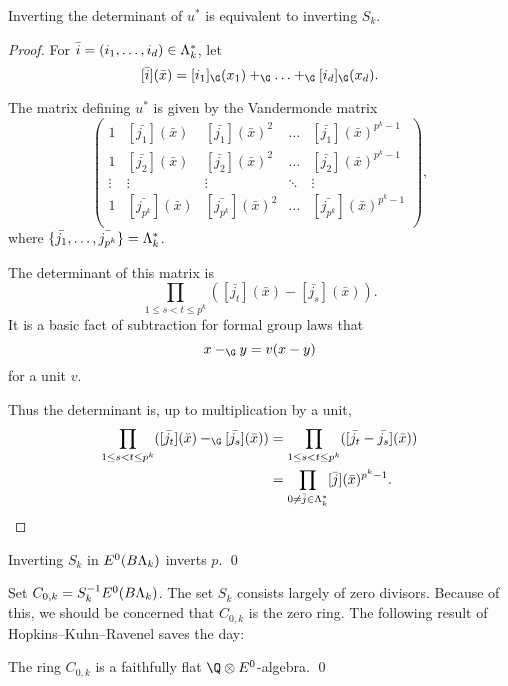 \begin{lemma} \label{det}
Inverting the determinant of $u^*$ is equivalent to inverting $S_k$.
\end{lemma}
\begin{proof}
For $\bar{i} = (i_1, \ldots, i_d) \in \Lambda_k^*$, let
\[
[\bar{i}](\bar{x}) = [i_1]_{\G}(x_1) +_{\G} \ldots +_{\G} [i_d]_{\G}(x_d).
\]

The matrix defining $u^*$ is given by the Vandermonde matrix
\[
\left(
\begin{array}{ccccc}
1 & [\bar{j_1}](\bar{x}) & [\bar{j_1}](\bar{x})^2 & \ldots & [\bar{j_{1}}](\bar{x})^{p^k-1} \\
1 & [\bar{j_2}](\bar{x}) & [\bar{j_2}](\bar{x})^2 & \ldots & [\bar{j_{2}}](\bar{x})^{p^k-1}\\
\vdots & \vdots & \vdots & \ddots & \vdots \\
1 & [\bar{j_{p^k}}](\bar{x}) & [\bar{j_{p^k}}](\bar{x})^2 & \ldots & [\bar{j_{p^k}}](\bar{x})^{p^k-1}\\
\end{array} \right),
\]
where $\{\bar{j_1},\ldots,\bar{j_{p^k}}\} = \Lambda_k^*$.

The determinant of this matrix is
\[
\prod_{1 \leq s < t \leq p^k} ([\bar{j_t}](\bar{x}) - [\bar{j_s}](\bar{x})).
\]
It is a basic fact of subtraction for formal group laws that
\[
x -_{\G} y = v(x-y)
\]
for a unit $v$. 

Thus the determinant is, up to multiplication by a unit, 
\begin{align*}
\prod_{1 \leq s < t \leq p^k} ([\bar{j_t}](\bar{x}) -_{\G} [\bar{j_s}](\bar{x})) & = \prod_{1 \leq s < t \leq p^k} ([\bar{j_t} - \bar{j_s}](\bar{x})) \\
& = \prod_{0 \neq \bar{j} \in \Lk^*} [\bar{j}](\bar{x})^{p^k-1}. \qedhere
\end{align*} 
\end{proof}

\begin{corollary}
Inverting $S_k$ in $E^0(B\Lambda_k)$ inverts $p$. \pushQED\qed \qedhere \popQED
\end{corollary}

Set $C_{0,k} = S_{k}^{-1}E^0(B\Lambda_k)$.  The set $S_k$ consists largely of zero divisors. Because of this, we should be concerned that $C_{0,k}$ is the zero ring. The following result of Hopkins--Kuhn--Ravenel saves the day:

\begin{proposition}
The ring $C_{0,k}$ is a faithfully flat $\Q \otimes E^0$-algebra. \pushQED\qed \qedhere \popQED
\end{proposition}

